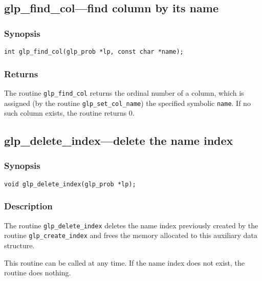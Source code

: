 \subsection{glp\_find\_col---find column by its name}

\subsubsection*{Synopsis}

\begin{verbatim}
int glp_find_col(glp_prob *lp, const char *name);
\end{verbatim}

\subsubsection*{Returns}

The routine \verb|glp_find_col| returns the ordinal number of a column,
which is assigned (by the routine \verb|glp_set_col_name|) the specified
symbolic \verb|name|. If no such column exists, the routine returns 0.

\subsection{glp\_delete\_index---delete the name index}

\subsubsection*{Synopsis}

\begin{verbatim}
void glp_delete_index(glp_prob *lp);
\end{verbatim}

\subsubsection*{Description}

The routine \verb|glp_delete_index| deletes the name index previously
created by the routine \verb|glp_create_index| and frees the memory
allocated to this auxiliary data structure.

This routine can be called at any time. If the name index does not
exist, the routine does nothing.


\newpage

